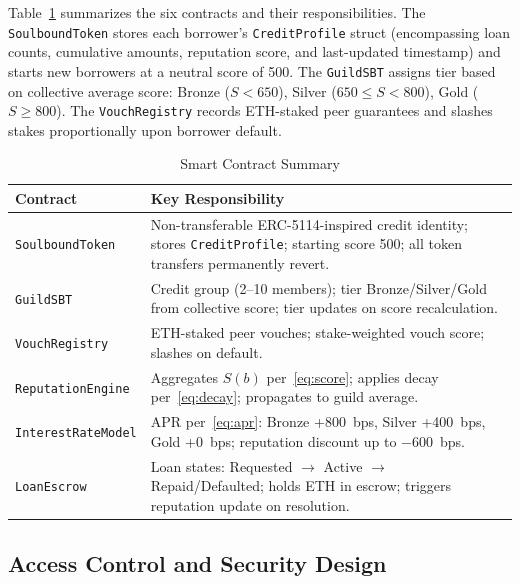 \documentclass[conference]{IEEEtran}
\begin{document}
Table~\ref{tab:contracts} summarizes the six contracts and their
responsibilities. The \texttt{SoulboundToken} stores each borrower's
\texttt{CreditProfile} struct (encompassing loan counts, cumulative amounts,
reputation score, and last-updated timestamp) and starts new borrowers at a
neutral score of 500. The \texttt{GuildSBT} assigns tier based on collective
average score: Bronze ($S < 650$), Silver ($650 \leq S < 800$), Gold
($S \geq 800$). The \texttt{VouchRegistry} records ETH-staked peer guarantees
and slashes stakes proportionally upon borrower default.

\begin{table}[t]
\caption{Smart Contract Summary}
\label{tab:contracts}
\centering
\begin{tabular}{p{1.9cm}p{4.7cm}}
\toprule
\textbf{Contract} & \textbf{Key Responsibility} \\
\midrule
\texttt{Soulbound}\newline\texttt{Token}
  & Non-transferable ERC-5114-inspired credit identity; stores \texttt{CreditProfile}; starting score 500; all token transfers permanently revert. \\[2pt]
\texttt{GuildSBT}
  & Credit group (2--10 members); tier Bronze/Silver/Gold from collective score; tier updates on score recalculation. \\[2pt]
\texttt{VouchRegistry}
  & ETH-staked peer vouches; stake-weighted vouch score; slashes on default. \\[2pt]
\texttt{Reputation}\newline\texttt{Engine}
  & Aggregates $S(b)$ per~\eqref{eq:score}; applies decay per~\eqref{eq:decay}; propagates to guild average. \\[2pt]
\texttt{InterestRate}\newline\texttt{Model}
  & APR per~\eqref{eq:apr}: Bronze +800~bps, Silver +400~bps, Gold +0~bps; reputation discount up to $-600$~bps. \\[2pt]
\texttt{LoanEscrow}
  & Loan states: Requested $\to$ Active $\to$ Repaid/Defaulted; holds ETH in escrow; triggers reputation update on resolution. \\
\bottomrule
\end{tabular}
\end{table}

\subsection{Access Control and Security Design}
\end{document}
